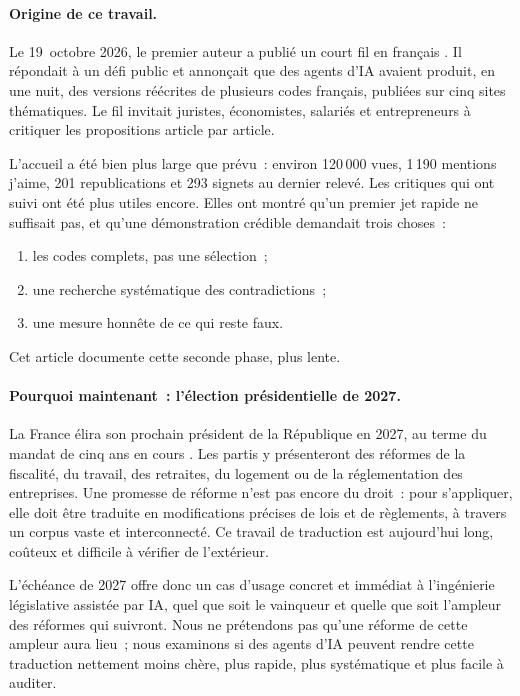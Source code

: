 \documentclass[11pt,a4paper]{article}
\begin{document}
\paragraph{Origine de ce travail.}
Le 19~octobre 2026, le premier auteur a publié un court fil en français \cite{tweet}. Il répondait à un défi public et annonçait que des agents d'IA avaient produit, en une nuit, des versions réécrites de plusieurs codes français, publiées sur cinq sites thématiques. Le fil invitait juristes, économistes, salariés et entrepreneurs à critiquer les propositions article par article.

L'accueil a été bien plus large que prévu~: environ 120\,000 vues, 1\,190 mentions \og j'aime\fg{}, 201 republications et 293 signets au dernier relevé. Les critiques qui ont suivi ont été plus utiles encore. Elles ont montré qu'un premier jet rapide ne suffisait pas, et qu'une démonstration crédible demandait trois choses~:
\begin{enumerate}[label=(\roman*)]
  \item les codes complets, pas une sélection~;
  \item une recherche systématique des contradictions~;
  \item une mesure honnête de ce qui reste faux.
\end{enumerate}
Cet article documente cette seconde phase, plus lente.

\paragraph{Pourquoi maintenant~: l'élection présidentielle de 2027.}
La France élira son prochain président de la République en 2027, au terme du mandat de cinq ans en cours \cite{constitution}. Les partis y présenteront des réformes de la fiscalité, du travail, des retraites, du logement ou de la réglementation des entreprises. Une promesse de réforme n'est pas encore du droit~: pour s'appliquer, elle doit être traduite en modifications précises de lois et de règlements, à travers un corpus vaste et interconnecté. Ce travail de traduction est aujourd'hui long, coûteux et difficile à vérifier de l'extérieur.

L'échéance de 2027 offre donc un cas d'usage concret et immédiat à l'ingénierie législative assistée par IA, quel que soit le vainqueur et quelle que soit l'ampleur des réformes qui suivront. Nous ne prétendons pas qu'une réforme de cette ampleur aura lieu~; nous examinons si des agents d'IA peuvent rendre cette traduction nettement moins chère, plus rapide, plus systématique et plus facile à auditer.
\end{document}
